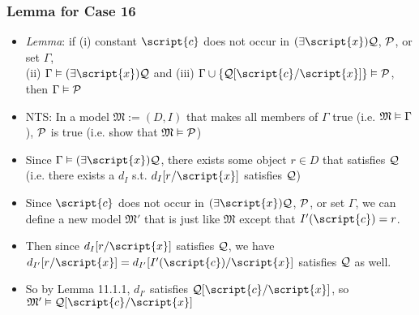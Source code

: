 \begin{frame}
\frametitle{Lemma for Case 16}

\begin{itemize}[<+->]

\item \emph{Lemma}: if (i) constant $\script{c}$ does not occur in $\qt{\exists}{\script{x}} \metav{Q}$, $\mathcal{P}$, or set $\Gamma$, \\ (ii) $\Gamma \entails \qt{\exists}{\script{x}} \metav{Q}$ and (iii) $\Gamma \cup \{ \metav{Q}\substitute{\script{x}}{\script{c}} \} \entails \metav{P}$, then $\Gamma \vDash \mathcal{P}$

\item NTS: In a model $\mathfrak{M}:=(D, I)$ that makes all members of $\Gamma$ true (i.e. $\mathfrak{M} \vDash \Gamma$), $\mathcal{P}$ is true (i.e. show that $\mathfrak{M} \vDash \mathcal{P}$)


\item Since $\Gamma \entails \qt{\exists}{\script{x}} \metav{Q}$, there exists some object $r \in D$ that satisfies $\mathcal{Q}$ (i.e. there exists a $d_I$ s.t. $d_I [r/ \script{x}]$ satisfies $\mathcal{Q}$) 

\item Since $\script{c}$ does not occur in $\qt{\exists}{\script{x}} \metav{Q}$, $\mathcal{P}$, or set $\Gamma$, we can define a new model $\mathfrak{M}'$ that is just like $\mathfrak{M}$ except that $I'(\script{c}) = r$. 

\item Then since $d_I [r/ \script{x}]$ satisfies $\mathcal{Q}$, we have $d_{I'} [r/ \script{x}] = d_{I'} [I'(\script{c})/ \script{x}]$ satisfies $\mathcal{Q}$ as well. 

\item So by Lemma 11.1.1, $d_{I'}$ satisfies $\metav{Q}\substitute{\script{x}}{\script{c}}$, so $\mathfrak{M}' \entails \metav{Q}\substitute{\script{x}}{\script{c}}$



\end{itemize}
\end{frame}
